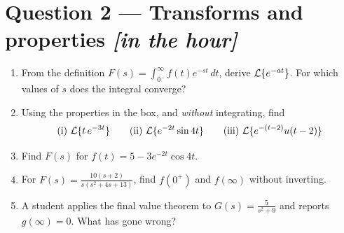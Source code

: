 \documentclass[11pt,a4paper]{article}
\newcommand{\inhour}{\hfill{\small\color{faccent}\itshape[in the hour]}}
\begin{document}
\section*{Question 2 --- Transforms and properties \inhour}

\begin{enumerate}[label=(\alph*)]
\item From the definition $F(s)=\int_{0^{-}}^{\infty}f(t)e^{-st}\,dt$, derive
      $\mathcal{L}\{e^{-at}\}$. For which values of $s$ does the integral converge?

\item Using the properties in the box, and \emph{without} integrating, find
      \[
        \text{(i) } \mathcal{L}\{t\,e^{-3t}\}\qquad
        \text{(ii) } \mathcal{L}\{e^{-2t}\sin 4t\}\qquad
        \text{(iii) } \mathcal{L}\{e^{-(t-2)}u(t-2)\}
      \]

\item Find $F(s)$ for $f(t)=5-3e^{-2t}\cos 4t$.

\item For $\displaystyle F(s)=\frac{10(s+2)}{s(s^{2}+4s+13)}$, find
      $f(0^{+})$ and $f(\infty)$ without inverting.

\item A student applies the final value theorem to
      $\displaystyle G(s)=\frac{5}{s^{2}+9}$ and reports $g(\infty)=0$.
      What has gone wrong?
\end{enumerate}
\end{document}
